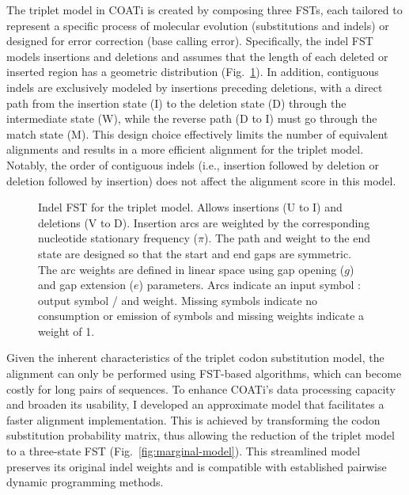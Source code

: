 The triplet model in COATi is created by composing three FSTs, each tailored to represent a specific process of molecular evolution (substitutions and indels) or designed for error correction (base calling error). Specifically, the indel FST models insertions and deletions and assumes that the length of each deleted or inserted region has a geometric distribution (Fig.~\ref{fig:indel-marginal}). In addition, contiguous indels are exclusively modeled by insertions preceding deletions, with a direct path from the insertion state (I) to the deletion state (D) through the intermediate state (W), while the reverse path (D to I) must go through the match state (M). This design choice effectively limits the number of equivalent alignments and results in a more efficient alignment for the triplet model. Notably, the order of contiguous indels (i.e., insertion followed by deletion or deletion followed by insertion) does not affect the alignment score in this model.

\begin{figure}[!ht]
    \centering
    \hspace*{-5em}\resizebox{1.05\textwidth}{!}{
    
    }
    \caption[COATi Indel Model]{Indel FST for the triplet model. Allows insertions (U to I) and deletions (V to D). Insertion arcs are weighted by the corresponding nucleotide stationary frequency ($\pi$). The path and weight to the end state are designed so that the start and end gaps are symmetric. The arc weights are defined in linear space using gap opening ($g$) and gap extension ($e$) parameters. Arcs indicate an input symbol : output symbol / and weight. Missing symbols indicate no consumption or emission of symbols and missing weights indicate a weight of 1.}
    \label{fig:indel-marginal}
\end{figure}

Given the inherent characteristics of the triplet codon substitution model, the alignment can only be performed using FST-based algorithms, which can become costly for long pairs of sequences. To enhance COATi's data processing capacity and broaden its usability, I developed an approximate model that facilitates a faster alignment implementation. This is achieved by transforming the codon substitution probability matrix, thus allowing the reduction of the triplet model to a three-state FST (Fig.~\ref{fig:marginal-model}). This streamlined model preserves its original indel weights and is compatible with established pairwise dynamic programming methods.

